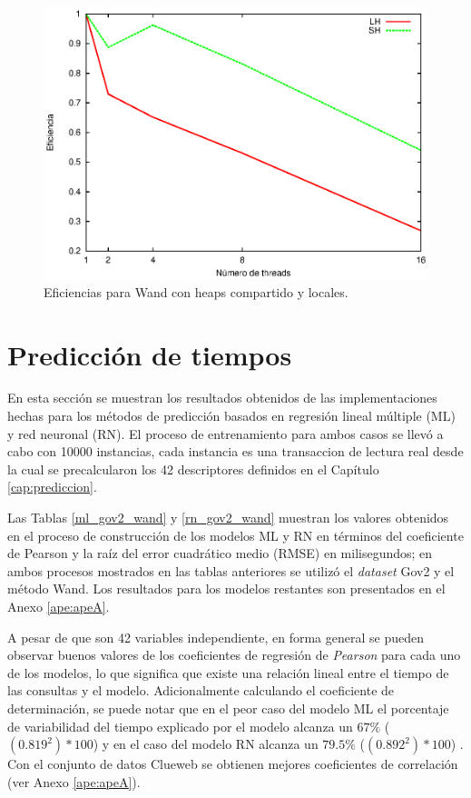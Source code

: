 \begin{figure}[tp]
\centering
\includegraphics[scale=.75]{images/eficiencias_wand.eps}
\caption{Eficiencias para Wand con heaps compartido y locales.}
\label{fig:eficiencias_wand}
\end{figure}

\section{Predicción de tiempos}
\label{evaluacionexperimental:predicciontiempos}
En esta sección se muestran los resultados obtenidos de las implementaciones hechas para los métodos de predicción basados en regresión lineal múltiple (ML) y red neuronal (RN). El proceso de entrenamiento para ambos casos se llevó a cabo con 10000 instancias, cada instancia es una transaccion de lectura real desde la cual se precalcularon los 42 descriptores definidos en el Capítulo \ref{cap:prediccion}. 

Las Tablas \ref{ml_gov2_wand} y \ref{rn_gov2_wand} muestran los valores obtenidos en el proceso de construcción de los modelos ML y RN en términos del coeficiente de Pearson y la raíz del error cuadrático medio (RMSE) en milisegundos; en ambos procesos mostrados en las tablas anteriores se utilizó el \textit{dataset} Gov2 y el método Wand. Los resultados para los modelos restantes son presentados en el Anexo \ref{ape:apeA}. 

A pesar de que son 42 variables independiente, en forma general se pueden observar buenos valores de los coeficientes de regresión de \textit{Pearson} para cada uno de los modelos, lo que significa que existe una relación lineal entre el tiempo de las consultas y el modelo. Adicionalmente calculando el coeficiente de determinación, se puede notar que en el peor caso del modelo ML el porcentaje de variabilidad del tiempo explicado por el modelo alcanza un $67\%$ ($(0.819^2) * 100$) y en el caso del modelo RN alcanza un $79.5\%$ ($(0.892^2) * 100$) . Con el conjunto de datos Clueweb se obtienen mejores coeficientes de correlación (ver Anexo \ref{ape:apeA}).

